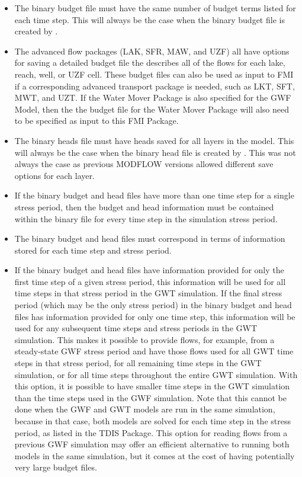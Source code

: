 \begin{itemize}
\begin{itemize}
\item The binary budget file must have the same number of budget terms listed for each time step.  This will always be the case when the binary budget file is created by \mf.
\item The advanced flow packages (LAK, SFR, MAW, and UZF) all have options for saving a detailed budget file the describes all of the flows for each lake, reach, well, or UZF cell.  These budget files can also be used as input to FMI if a corresponding advanced transport package is needed, such as LKT, SFT, MWT, and UZT.  If the Water Mover Package is also specified for the GWF Model, then the the budget file for the Water Mover Package will also need to be specified as input to this FMI Package.
\item The binary heads file must have heads saved for all layers in the model.  This will always be the case when the binary head file is created by \mf.  This was not always the case as previous MODFLOW versions allowed different save options for each layer.
\item If the binary budget and head files have more than one time step for a single stress period, then the budget and head information must be contained within the binary file for every time step in the simulation stress period.
\item The binary budget and head files must correspond in terms of information stored for each time step and stress period.
\item If the binary budget and head files have information provided for only the first time step of a given stress period, this information will be used for all time steps in that stress period in the GWT simulation. If the final stress period (which may be the only stress period) in the binary budget and head files has information provided for only one time step, this information will be used for any subsequent time steps and stress periods in the GWT simulation. This makes it possible to provide flows, for example, from a steady-state GWF stress period and have those flows used for all GWT time steps in that stress period, for all remaining time steps in the GWT simulation, or for all time steps throughout the entire GWT simulation. With this option, it is possible to have smaller time steps in the GWT simulation than the time steps used in the GWF simulation. Note that this cannot be done when the GWF and GWT models are run in the same simulation, because in that case, both models are solved for each time step in the stress period, as listed in the TDIS Package. This option for reading flows from a previous GWF simulation may offer an efficient alternative to running both models in the same simulation, but it comes at the cost of having potentially very large budget files.
\end{itemize}

\end{itemize}

